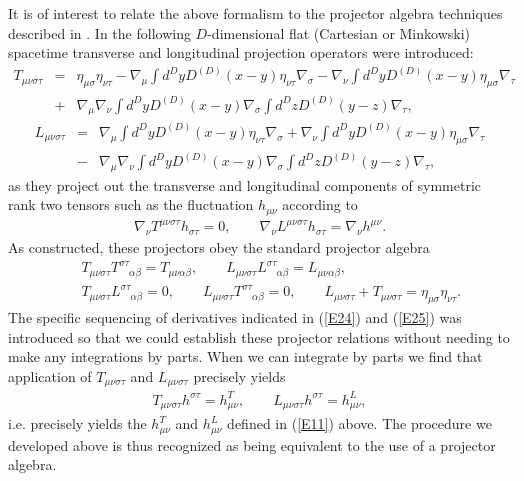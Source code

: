 \documentclass[aps]{revtex4}
\begin{document}
It is of interest to relate the above formalism to the projector algebra techniques described in \cite{Mannheim2005}. In \cite{Mannheim2005} the following $D$-dimensional flat (Cartesian or Minkowski) spacetime transverse and longitudinal projection operators were introduced: 
%
\begin{eqnarray}
T_{\mu\nu\sigma\tau}&=&\eta_{\mu\sigma}\eta_{\nu\tau}
-\nabla_{\mu}\int d^DyD^{(D)}(x-y)
\eta_{\nu\tau}\nabla_{\sigma}
-\nabla_{\nu}\int d^DyD^{(D)}(x-y)
\eta_{\mu\sigma}\nabla_{\tau}
\nonumber \\
&+&\nabla_{\mu}\nabla_{\nu}\int
d^DyD^{(D)}(x-y)\nabla_{\sigma}\int
d^DzD^{(D)}(y-z)
\nabla_{\tau},
\label{E24}
\end{eqnarray}
%
%
\begin{eqnarray}
L_{\mu\nu\sigma\tau}&=&\nabla_{\mu}\int d^DyD^{(D)}(x-y)
\eta_{\nu\tau}\nabla_{\sigma}
+\nabla_{\nu}\int d^DyD^{(D)}(x-y)
\eta_{\mu\sigma}\nabla_{\tau}
\nonumber \\
&-&\nabla_{\mu}\nabla_{\nu}\int
d^DyD^{(D)}(x-y)\nabla_{\sigma}\int
d^DzD^{(D)}(y-z)
\nabla_{\tau},
\label{E25}
\end{eqnarray}
%
as they project out the transverse and longitudinal components of symmetric rank two tensors such as the fluctuation $h_{\mu\nu}$ according to 
%
\begin{eqnarray}
\nabla_{\nu}T^{\mu\nu\sigma\tau}h_{\sigma\tau}
=0,\qquad 
\nabla_{\nu}L^{\mu\nu\sigma\tau}h_{\sigma\tau}=\nabla_{\nu}h^{\mu\nu}.
\label{E26}
\end{eqnarray}
% 
As constructed, these projectors obey the standard projector algebra
%
\begin{eqnarray}
&&T_{\mu\nu\sigma\tau}T^{\sigma\tau}_{\phantom{\sigma\tau}\alpha\beta}=
T_{\mu\nu\alpha\beta},\qquad
L_{\mu\nu\sigma\tau}L^{\sigma\tau}_{\phantom{\sigma\tau}\alpha\beta}
=L_{\mu\nu\alpha\beta},
\nonumber \\
&&T_{\mu\nu\sigma\tau}L^{\sigma\tau}_{\phantom{\sigma\tau}\alpha\beta}=
0,\qquad
L_{\mu\nu\sigma\tau}T^{\sigma\tau}_{\phantom{\sigma\tau}\alpha\beta}
=0,\qquad L_{\mu\nu\sigma\tau}
+T_{\mu\nu\sigma\tau}
=\eta_{\mu\sigma}\eta_{\nu\tau}.
\label{E27}
\end{eqnarray}
% 
The specific sequencing of derivatives indicated in (\ref{E24}) and (\ref{E25}) was introduced so that we could establish these projector relations without needing to make any  integrations by parts. When we can integrate by parts we find that application of $T_{\mu\nu\sigma\tau}$ and $L_{\mu\nu\sigma\tau}$ precisely yields 
%
\begin{eqnarray}
T_{\mu\nu\sigma\tau}h^{\sigma\tau}=h^T_{\mu\nu},\qquad 
L_{\mu\nu\sigma\tau}h^{\sigma\tau}
=h^L_{\mu\nu},
\label{E28}
\end{eqnarray}
% 
i.e. precisely yields the  $h^T_{\mu\nu}$ and $h^L_{\mu\nu}$ defined in (\ref{E11}) above. The procedure we developed above is thus recognized as being equivalent to the use of a projector algebra. 
\end{document}
